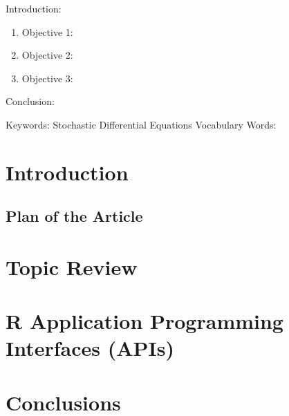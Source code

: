 

\twocolumn
\scriptsize
\begin{frontmatter}
		\title{}
		\author{}
		\address{The Mathematical Learning Space}
\end{frontmatter}	

Introduction:
\begin{enumerate}
\item Objective 1:
\item Objective 2:
\item Objective 3:
\end{enumerate}
Conclusion:

Keywords: Stochastic Differential Equations
Vocabulary Words:

\section{Introduction}

\subsection{Plan of the Article}


\section{Topic Review}

\section{R Application Programming Interfaces (APIs)}

\section{Conclusions}





\begin{thebibliography}{00}

\end{thebibliography}

